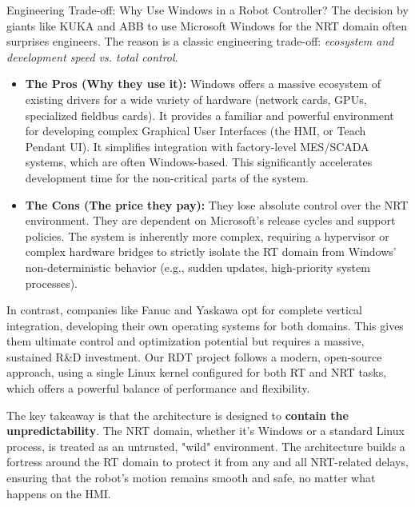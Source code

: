 \vspace{0.3cm}
\begin{tipbox}{Engineering Trade-off: Why Use Windows in a Robot Controller?}
The decision by giants like KUKA and ABB to use Microsoft Windows for the NRT domain often surprises engineers. The reason is a classic engineering trade-off: \textit{ecosystem and development speed vs. total control}.
\begin{itemize}
    \item \textbf{The Pros (Why they use it):} Windows offers a massive ecosystem of existing drivers for a wide variety of hardware (network cards, GPUs, specialized fieldbus cards). It provides a familiar and powerful environment for developing complex Graphical User Interfaces (the HMI, or Teach Pendant UI). It simplifies integration with factory-level MES/SCADA systems, which are often Windows-based. This significantly accelerates development time for the non-critical parts of the system.
    \item \textbf{The Cons (The price they pay):} They lose absolute control over the NRT environment. They are dependent on Microsoft's release cycles and support policies. The system is inherently more complex, requiring a hypervisor or complex hardware bridges to strictly isolate the RT domain from Windows' non-deterministic behavior (e.g., sudden updates, high-priority system processes).
\end{itemize}
In contrast, companies like Fanuc and Yaskawa opt for complete vertical integration, developing their own operating systems for both domains. This gives them ultimate control and optimization potential but requires a massive, sustained R\&D investment. Our RDT project follows a modern, open-source approach, using a single Linux kernel configured for both RT and NRT tasks, which offers a powerful balance of performance and flexibility.
\end{tipbox}

The key takeaway is that the architecture is designed to \textbf{contain the unpredictability}. The NRT domain, whether it's Windows or a standard Linux process, is treated as an untrusted, "wild" environment. The architecture builds a fortress around the RT domain to protect it from any and all NRT-related delays, ensuring that the robot's motion remains smooth and safe, no matter what happens on the HMI.



